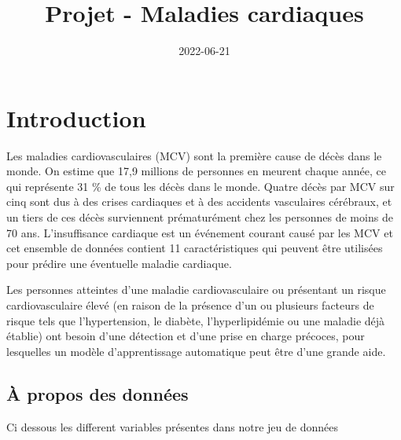\documentclass[
]{article}
\title{Projet - Maladies cardiaques}
\author{}
\date{\vspace{-2.5em}2022-06-21}
\begin{document}
\maketitle

\hypertarget{introduction}{%
\section{Introduction}\label{introduction}}

Les maladies cardiovasculaires (MCV) sont la première cause de décès
dans le monde. On estime que 17,9 millions de personnes en meurent
chaque année, ce qui représente 31 \% de tous les décès dans le monde.
Quatre décès par MCV sur cinq sont dus à des crises cardiaques et à des
accidents vasculaires cérébraux, et un tiers de ces décès surviennent
prématurément chez les personnes de moins de 70 ans. L'insuffisance
cardiaque est un événement courant causé par les MCV et cet ensemble de
données contient 11 caractéristiques qui peuvent être utilisées pour
prédire une éventuelle maladie cardiaque.

Les personnes atteintes d'une maladie cardiovasculaire ou présentant un
risque cardiovasculaire élevé (en raison de la présence d'un ou
plusieurs facteurs de risque tels que l'hypertension, le diabète,
l'hyperlipidémie ou une maladie déjà établie) ont besoin d'une détection
et d'une prise en charge précoces, pour lesquelles un modèle
d'apprentissage automatique peut être d'une grande aide.

\hypertarget{uxe0-propos-des-donnuxe9es}{%
\subsection{À propos des données}\label{uxe0-propos-des-donnuxe9es}}

Ci dessous les different variables présentes dans notre jeu de données
\end{document}
